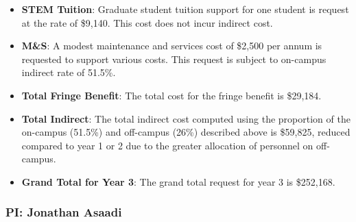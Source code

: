 \begin{enumerate}
\begin{itemize}[noitemsep,nolistsep]
{It is worthwhile to note that this increase in travel cost request compared to year 1 is offset by the reduction in the indirect cost, thanks to taking advantage of the 26\% off-campus rate.}

\item {{\bf STEM Tuition}: Graduate student tuition support for one student is request at the rate of \$9,140.  This cost does not incur indirect cost.}

\item {{\bf M\&S}: A modest maintenance and services cost of \$2,500 per annum is requested to support various costs.   This request is subject to on-campus indirect rate of 51.5\%.}

\item {{\bf Total Fringe Benefit}: The total cost for the fringe benefit is \$29,184.}

\item {{\bf Total Indirect}: The total indirect cost computed using the proportion of the on-campus (51.5\%) and off-campus (26\%) described above is \$59,825, reduced compared to year 1 or 2 due to the greater allocation of personnel on off-campus.}

\item {{\bf Grand Total for Year 3}: The grand total request for year 3 is \$252,168.}

\end{itemize}

\end{enumerate}

\newpage

\subsubsection{\bf PI: Jonathan Asaadi}

